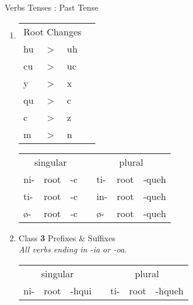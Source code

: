 \documentclass[12pt]{beamer}
\newcommand{\nah}[1]{\textcolor{nahgrn}{#1}}
\newcommand{\trs}[1]{\textcolor{nahblu}{#1}}
\begin{document}
\begin{frame}
\begin{columns}[t]
\begin{column}{.26\linewidth}
\begin{block}{Verbs Tenses : Past Tense}
\begin{enumerate}
    			\item \text{Class \textbf{2} \nah{Prefixes} \& \trs{Suffixes}} \newline
    			\newline
    			\begin{tabular}[t]{llll}
    				\multicolumn{3}{c}{Root Changes} & \vline \\
    				\cline{1-3}
    				hu	& > & uh & \vline	\\
    				cu	& > & uc & \vline	\\
    				y	& > & x	 & \vline	\\
    				qu	& > & c	 & \vline 	\\
    				c	& > & z	 & \vline 	\\
    				m	& > & n	 & \vline 	\\
    			\end{tabular}%
    			\begin{tabular}[t]{lllllll}
    				\multicolumn{3}{c}{singular}    & \vline & \multicolumn{3}{c}{plural}        \\
    				\cline{1-7}
    				\nah{ni-}   & root & \trs{-c}   & \vline & \nah{ti-}   & root & \trs{-queh}  \\
    				\nah{ti-}   & root & \trs{-c}   & \vline & \nah{in-}   & root & \trs{-queh}  \\
    				\nah{ø-}    & root & \trs{-c}   & \vline & \nah{ø-}    & root & \trs{-queh}  \\
    			\end{tabular}
    			\item Class \textbf{3} \nah{Prefixes} \& \trs{Suffixes} 			\\
    			\textit{All verbs ending in -ia or -oa.}							\\
    			\begin{tabular}[t]{lllllll}
    				\multicolumn{3}{c}{singular}    & \vline & \multicolumn{3}{c}{plural}        	\\
    				\cline{1-7}
    				\nah{ni-}   & root & \trs{-hqui}   & \vline & \nah{ti-}   & root & \trs{-hqueh} \\

\end{tabular}
\end{enumerate}
\end{block}
\end{column}
\end{columns}
\end{frame}
\end{document}
